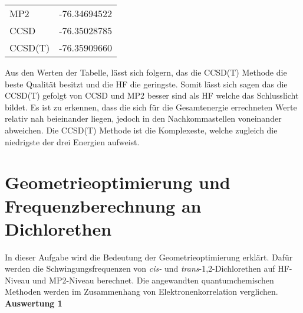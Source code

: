 \documentclass[12pt]{article}
\begin{document}
\begin{onehalfspace}
\begin{table}[!htpb]
\begin{tabular}{ll}
MP2 & -76.34694522\\
CCSD & -76.35028785 \\
CCSD(T) & -76.35909660\\
\bottomrule
\end{tabular}
\end{table}

Aus den Werten der Tabelle, lässt sich folgern, das die CCSD(T) Methode die beste Qualität besitzt und die HF die geringste.
Somit lässt sich sagen das die CCSD(T) gefolgt von CCSD und MP2 besser sind als HF welche das Schlusslicht bildet.
Es ist zu erkennen, dass die sich für die Gesamtenergie errechneten Werte relativ nah beieinander liegen, jedoch in den Nachkommastellen voneinander abweichen. Die CCSD(T) Methode ist die Komplexeste, welche zugleich die niedrigste der drei Energien aufweist.


\section{Geometrieoptimierung und Frequenzberechnung an Dichlorethen}
In dieser Aufgabe wird die Bedeutung der Geometrieoptimierung erklärt.
Dafür werden die Schwingungsfrequenzen von \textit{cis-} und \textit{trans}-1,2-Dichlorethen auf HF-Niveau und MP2-Niveau berechnet.
Die angewandten quantumchemischen Methoden werden im Zusammenhang von Elektronenkorrelation verglichen.\\
\textbf{Auswertung 1 }
\begin{figure}[!hptb]
    \caption{Die optimierten Geometrien}
    \begin{subfigure}[b]{0.4\textwidth}
    \end{subfigure}
    ~ %
    \begin{subfigure}[b]{0.4\textwidth}
    \end{subfigure}
    \label{figure:opt}
\end{figure}


\begin{table}[!htpb]


\end{table}
\end{onehalfspace}
\end{document}
